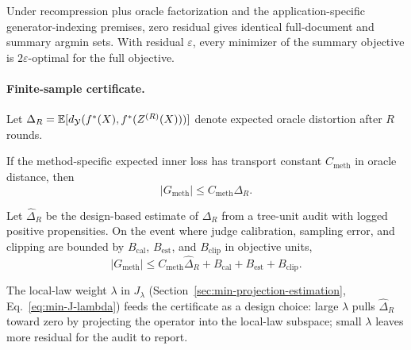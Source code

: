 \begin{theorem}\label{thm:pref-equiv}
Under recompression plus oracle factorization and the application-specific
generator-indexing premises, zero residual gives identical full-document and
summary argmin sets. With residual $\varepsilon$, every minimizer of the
summary objective is $2\varepsilon$-optimal for the full objective.
\end{theorem}

\paragraph{Finite-sample certificate.}
Let
$\Delta_R=\mathbb{E}[d_{\mathcal{Y}}(f^\ast(X),f^\ast(Z^{(R)}(X)))]$ denote expected oracle
distortion after $R$ rounds.

\begin{theorem}\label{thm:unified-gap}
If the method-specific expected inner loss has transport constant
$C_{\mathrm{meth}}$ in oracle distance, then
\[
  |G_{\mathrm{meth}}|\le C_{\mathrm{meth}}\Delta_R.
\]
\end{theorem}

\begin{theorem}\label{thm:e2e}
Let $\hat\Delta_R$ be the design-based estimate of $\Delta_R$ from a
tree-unit audit with logged positive propensities. On the event where judge
calibration, sampling error, and clipping are bounded by
$B_{\mathrm{cal}}$, $B_{\mathrm{est}}$, and $B_{\mathrm{clip}}$ in objective
units,
\[
  |G_{\mathrm{meth}}|
  \le
  C_{\mathrm{meth}}\hat{\Delta}_R
  + B_{\mathrm{cal}} + B_{\mathrm{est}} + B_{\mathrm{clip}}.
\]
\end{theorem}

The local-law weight $\lambda$ in $J_\lambda$
(Section~\ref{sec:min-projection-estimation}, Eq.~\ref{eq:min-J-lambda})
feeds the certificate as a design choice: large $\lambda$ pulls
$\hat{\Delta}_R$ toward zero by projecting the operator into the
local-law subspace; small $\lambda$ leaves more residual for the audit
to report.

